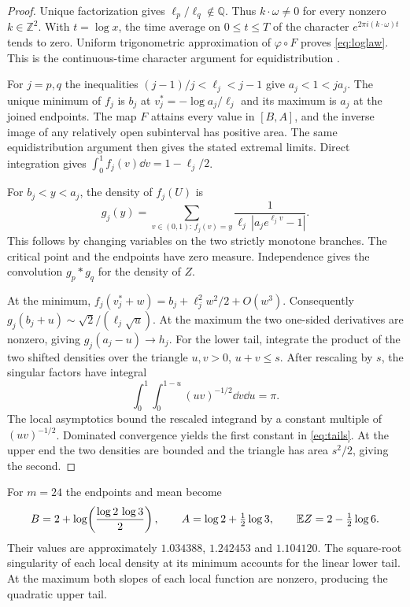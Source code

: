 \begin{proof}
Unique factorization gives $\ell_p/\ell_q\notin\mathbb Q$.
Thus $k\cdot\omega\ne0$ for every nonzero $k\in\mathbb Z^2$.
With $t=\log x$, the time average on $0\leq t\leq T$ of the character
$e^{2\pi i (k\cdot\omega)t}$ tends to zero. Uniform trigonometric
approximation of $\varphi\circ F$ proves \eqref{eq:loglaw}. This is
the continuous-time character argument for equidistribution \cite{weyl}.

For $j=p,q$ the inequalities $(j-1)/j<\ell_j<j-1$ give
$a_j<1<j a_j$. The unique minimum of $f_j$ is $b_j$ at
$v_j^*=-\log a_j/\ell_j$ and its maximum is $a_j$ at the joined
endpoints. The map $F$ attains every value in $[B,A]$, and the inverse
image of any relatively open subinterval has positive area. The same
equidistribution argument then gives the stated extremal limits.
Direct integration gives $\int_0^1 f_j(v)\dd v=1-\ell_j/2$.

For $b_j<y<a_j$, the density of $f_j(U)$ is
\begin{equation}
 g_j(y)=\sum_{v\in(0,1):\, f_j(v)=y}
               \frac{1}{\ell_j\,|a_j e^{\ell_j v}-1|}.
 \label{eq:density}
\end{equation}
This follows by changing variables on the two strictly monotone
branches. The critical point and the endpoints have zero measure.
Independence gives the convolution $g_p*g_q$ for the density of $Z$.

At the minimum, $f_j(v_j^*+w)=b_j+\ell_j^2w^2/2+O(w^3)$.
Consequently $g_j(b_j+u)\sim\sqrt{2}/(\ell_j\sqrt{u})$. At the
maximum the two one-sided derivatives are nonzero, giving
$g_j(a_j-u)\to h_j$. For the lower tail, integrate the product of
the two shifted densities over the triangle $u,v>0$, $u+v\leq s$.
After rescaling by $s$, the singular factors have integral
\[
 \int_0^1\int_0^{1-u}(uv)^{-1/2}\dd v\dd u=\pi .
\]
The local asymptotics bound the rescaled integrand by a constant
multiple of $(uv)^{-1/2}$. Dominated convergence yields the first
constant in \eqref{eq:tails}. At the upper end the two densities are
bounded and the triangle has area $s^2/2$, giving the second.
\end{proof}

For $m=24$ the endpoints and mean become
\[
 B=2+\log\!\left(\frac{\log 2\,\log 3}{2}\right),\qquad
 A=\log 2+\tfrac12\log 3,\qquad \mathbb E Z=2-\tfrac12\log 6.
\]
Their values are approximately $1.034388$, $1.242453$ and $1.104120$.
The square-root singularity of each local density at its minimum
accounts for the linear lower tail. At the maximum both slopes of each
local function are nonzero, producing the quadratic upper tail.
